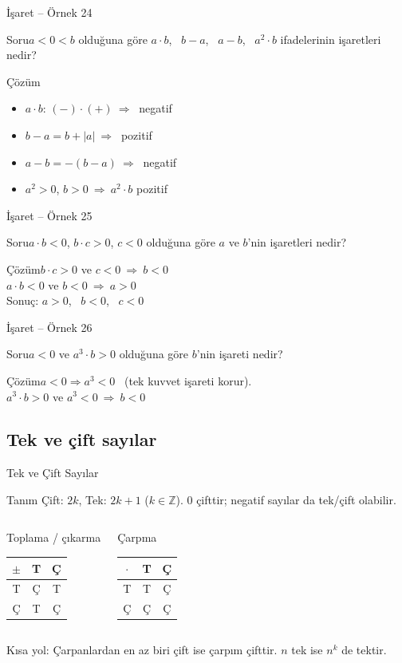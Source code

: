 \documentclass[aspectratio=169,11pt,handout]{beamer}
\newcommand{\soru}[3]{%
\begin{frame}{#1}
  \begin{block}{Soru}\large #2\end{block}
  \pause
  \begin{exampleblock}{Çözüm}\large #3\end{exampleblock}
\end{frame}}
\begin{document}
\soru{İşaret -- Örnek 24}
{\(a<0<b\) olduğuna göre \(a\cdot b\), \ \(b-a\), \ \(a-b\), \ \(a^2\cdot b\) ifadelerinin işaretleri nedir?}
{\begin{itemize}
\item \(a\cdot b\): \((-)\cdot(+)\ \Rightarrow\ \) negatif
\item \(b-a=b+|a|\ \Rightarrow\ \) pozitif
\item \(a-b=-(b-a)\ \Rightarrow\ \) negatif
\item \(a^2>0\), \(b>0\ \Rightarrow\ a^2\cdot b\) pozitif
\end{itemize}}

\soru{İşaret -- Örnek 25}
{\(a\cdot b<0\), \quad \(b\cdot c>0\), \quad \(c<0\) olduğuna göre \(a\) ve \(b\)'nin işaretleri nedir?}
{\(b\cdot c>0\) ve \(c<0\ \Rightarrow\ b<0\)\\[3pt]
\(a\cdot b<0\) ve \(b<0\ \Rightarrow\ a>0\)\\[3pt]
Sonuç: \(a>0\), \ \(b<0\), \ \(c<0\)}

\soru{İşaret -- Örnek 26}
{\(a<0\) ve \(a^3\cdot b>0\) olduğuna göre \(b\)'nin işareti nedir?}
{\(a<0\Rightarrow a^3<0\) \ (tek kuvvet işareti korur).\\[3pt]
\(a^3\cdot b>0\) ve \(a^3<0\ \Rightarrow\ b<0\)}

\subsection{Tek ve çift sayılar}
\begin{frame}{Tek ve Çift Sayılar}
\begin{block}{Tanım}
Çift: \(2k\), \quad Tek: \(2k+1\) \qquad (\(k\in\mathbb{Z}\)). \quad \(0\) çifttir; negatif sayılar da tek/çift olabilir.
\end{block}
\begin{columns}[t]
\begin{block}{Toplama / çıkarma}
\begin{tabular}{c|cc}
\(\pm\) & T & Ç\\\hline
T & Ç & T\\
Ç & T & Ç
\end{tabular}
\end{block}
\begin{block}{Çarpma}
\begin{tabular}{c|cc}
\(\cdot\) & T & Ç\\\hline
T & T & Ç\\
Ç & Ç & Ç
\end{tabular}
\end{block}
\end{columns}
\vspace{4pt}
Kısa yol: Çarpanlardan en az biri çift ise çarpım çifttir. \(n\) tek ise \(n^k\) de tektir.
\end{frame}
\end{document}
